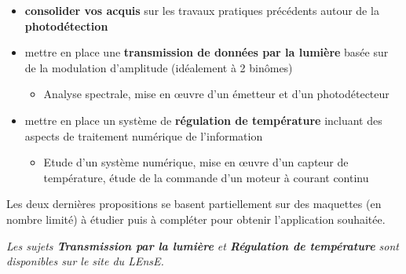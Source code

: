 \begin{itemize}[label=$\square$]
	\item \textbf{consolider vos acquis} sur les travaux pratiques précédents autour de la \textbf{photodétection}
	\item mettre en place une \textbf{transmission de données par la lumière} basée sur de la modulation d'amplitude (idéalement à 2 binômes)
	\begin{itemize}[label=$\blacktriangleright$]
		\item Analyse spectrale, mise en \oe{}uvre d'un émetteur et d'un photodétecteur
	\end{itemize}	
	
	\item mettre en place un système de \textbf{régulation de température} incluant des aspects de traitement numérique de l'information
	\begin{itemize}[label=$\blacktriangleright$]
		\item Etude d'un système numérique, mise en \oe{}uvre d'un capteur de température, étude de la commande d'un moteur à courant continu
	\end{itemize}
	
\end{itemize}

\medskip

Les deux dernières propositions se basent partiellement sur des maquettes (en nombre limité) à étudier puis à compléter pour obtenir l'application souhaitée.

\bigskip

\textit{Les sujets \textbf{Transmission par la lumière} et \textbf{Régulation de température} sont disponibles sur le site du LEnsE.}




